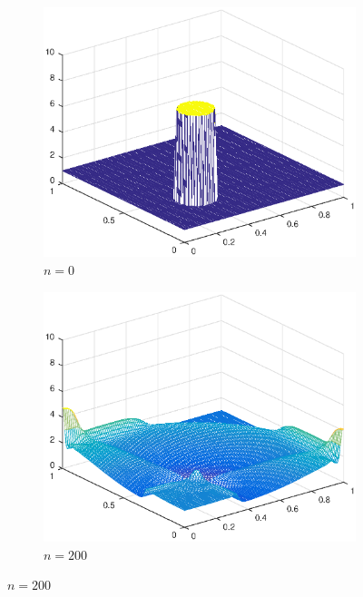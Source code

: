 \begin{figure}[h!]
    \centering
    \begin{subfigure}[t]{0.4\textwidth}
        \centering
        \includegraphics[width=\textwidth]{images/sol_ri_0000cf.eps}
        \caption{$n=0$}
        \label{fig:0}
    \end{subfigure}
    \begin{subfigure}[t]{0.48\textwidth}
        \centering
        \includegraphics[width=\textwidth]{images/sol_ri_0200cf.eps}
        \caption{$n=200$}
        \label{fig:10}
    \end{subfigure}

\end{figure}

